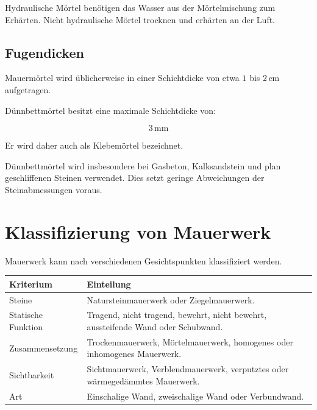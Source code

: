 \documentclass[
  12pt,
  a4paper,
  oneside
]{scrreprt}
\begin{document}
Hydraulische Mörtel benötigen das Wasser aus der Mörtelmischung zum
Erhärten. Nicht hydraulische Mörtel trocknen und erhärten an der Luft.


\subsection{Fugendicken}

Mauermörtel wird üblicherweise in einer Schichtdicke von etwa
\(1\) bis \(2\,\mathrm{cm}\) aufgetragen.


Dünnbettmörtel besitzt eine maximale Schichtdicke von:

\begin{equation}
  3\,\mathrm{mm}
\end{equation}

Er wird daher auch als Klebemörtel bezeichnet.


Dünnbettmörtel wird insbesondere bei Gasbeton, Kalksandstein und plan
geschliffenen Steinen verwendet. Dies setzt geringe Abweichungen der
Steinabmessungen voraus.


\section{Klassifizierung von Mauerwerk}

Mauerwerk kann nach verschiedenen Gesichtspunkten klassifiziert werden.

\begin{longtable}{
  >{\raggedright\arraybackslash}p{}
  >{\raggedright\arraybackslash}p{}
}
\toprule
\textbf{Kriterium} &
\textbf{Einteilung} \\
\midrule
\endhead

Steine &
Natursteinmauerwerk oder Ziegelmauerwerk. \\

Statische Funktion &
Tragend, nicht tragend, bewehrt, nicht bewehrt, aussteifende Wand oder
Schubwand. \\

Zusammensetzung &
Trockenmauerwerk, Mörtelmauerwerk, homogenes oder inhomogenes
Mauerwerk. \\

Sichtbarkeit &
Sichtmauerwerk, Verblendmauerwerk, verputztes oder wärmegedämmtes
Mauerwerk. \\

Art &
Einschalige Wand, zweischalige Wand oder Verbundwand. \\

\bottomrule
\end{longtable}
\end{document}
